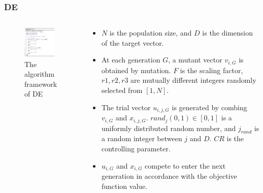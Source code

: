 \documentclass[xcolor=dvipsnames]{beamer}
\begin{document}
    \begin{frame}
    \frametitle{DE}

    \begin{columns}
        \begin{column}{0.5\textwidth}
        \begin{figure}[H]
            \graphicspath{{figs/}}
            \includegraphics[width=0.9\textwidth]{de.png}
            \caption{The algorithm framework of DE}
        \end{figure}
    \end{column}
    \begin{column}{0.5\textwidth}
    \begin{itemize}\small
    \setlength\itemsep{0em}
      \item $N$ is the population size, and $D$ is the dimension of the target vector.
      \item At each generation $G$, a mutant vector $v_{i,G}$ is obtained by mutation. $F$ is the scaling factor, $r1, r2, r3$ are mutually different integers randomly selected from $[1,N]$.
      \item The trial vector $u_{i,j,G}$ is generated by combing $v_{i,G}$ and $x_{i,j,G}$. $rand_j(0,1)\in[0, 1]$ is a uniformly distributed random number, and $j_{rand}$ is a random integer between $j$ and $D$. $CR$ is the controlling parameter.
      \item $u_{i,G}$ and $x_{i,G}$ compete to enter the next generation in accordance with the objective function value.
    \end{itemize}
    \end{column}
    \end{columns}

    \end{frame}
\end{document}
